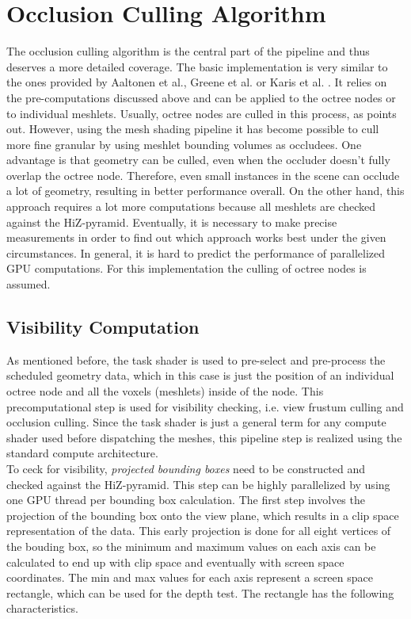 \section{Occlusion Culling Algorithm} \label{sec-occlusion}

The occlusion culling algorithm is the central part of the pipeline and thus deserves a more detailed coverage. The 
basic implementation is very similar to the ones provided by Aaltonen et al., Greene et al. or Karis et al. 
\cite{Aaltonen2015,Greene93,Karis2021}. It relies on the pre-computations discussed above and can be applied to the 
octree nodes or to individual meshlets. Usually, octree nodes are culled in this process, as \cite{AkenineMoeller2018}
points out. However, using the mesh shading pipeline it has become possible to cull more fine granular by using 
meshlet bounding volumes as occludees. One advantage is that geometry can be culled, even when the occluder doesn't 
fully overlap the octree node. Therefore, even small instances in the scene can occlude a lot of geometry, resulting 
in better performance overall. On the other hand, this approach requires a lot more computations because all meshlets 
are checked against the \ac{HiZ}-pyramid. Eventually, it is necessary to make precise measurements in order to find out 
which approach works best under the given circumstances. In general, it is hard to predict the performance of 
parallelized \ac{GPU} computations. For this implementation the culling of octree nodes is assumed. 

\subsection*{Visibility Computation} \label{subsec-visibility-computation}

As mentioned before, the task shader is used to pre-select and pre-process the scheduled geometry data, 
which in this case is just the position of an individual octree node and all the voxels (meshlets) inside of the 
node. This precomputational step is used for visibility checking, i.e. view frustum culling and occlusion culling. 
Since the task shader is just a general term for any compute shader used before dispatching the meshes, 
this pipeline step is realized using the standard compute architecture. \\

\noindent
To ceck for visibility, \emph{projected bounding boxes} need to be constructed and checked against the 
\ac{HiZ}-pyramid. This step can be highly parallelized by using one \ac{GPU} thread per bounding box calculation. 
The first step involves the projection of the bounding box onto the view plane, which results in a clip space 
representation of the data. This early projection is done for all eight vertices of the bouding box, so the minimum 
and maximum values on each axis can be calculated to end up with clip space and eventually with screen space coordinates.
The min and max values for each axis represent a screen space rectangle, which can be used for the depth test. The 
rectangle has the following characteristics.

